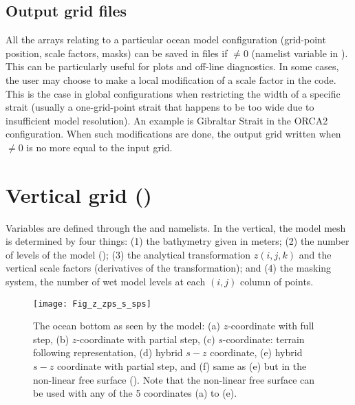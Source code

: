 \documentclass[../main/NEMO_manual]{subfiles}
\begin{document}
\subsection{Output grid files}
\label{subsec:DOM_hgr_files}

All the arrays relating to a particular ocean model configuration (grid-point position, scale factors, masks)
can be saved in files if  $\not= 0$ (namelist variable in ).
This can be particularly useful for plots and off-line diagnostics.
In some cases, the user may choose to make a local modification of a scale factor in the code.
This is the case in global configurations when restricting the width of a specific strait
(usually a one-grid-point strait that happens to be too wide due to insufficient model resolution).
An example is Gibraltar Strait in the ORCA2 configuration.
When such modifications are done,
the output grid written when  $\not= 0$ is no more equal to the input grid.

\section{Vertical grid (\protect{})}
\label{sec:DOM_zgr}
%


Variables are defined through the  and  namelists.
In the vertical, the model mesh is determined by four things: 
(1) the bathymetry given in meters; 
(2) the number of levels of the model (); 
(3) the analytical transformation $z(i,j,k)$ and the vertical scale factors (derivatives of the transformation); and
(4) the masking system, \ie the number of wet model levels at each 
$(i,j)$ column of points.

\begin{figure}[!tb]
  \begin{center}
    \texttt{[image: Fig\_z\_zps\_s\_sps]}
    \caption{
      \protect\label{fig:z_zps_s_sps}
      The ocean bottom as seen by the model:
      (a) $z$-coordinate with full step,
      (b) $z$-coordinate with partial step,
      (c) $s$-coordinate: terrain following representation,
      (d) hybrid $s-z$ coordinate,
      (e) hybrid $s-z$ coordinate with partial step, and
      (f) same as (e) but in the non-linear free surface (\protect{}).
      Note that the non-linear free surface can be used with any of the 5 coordinates (a) to (e).
    }
  \end{center}
\end{figure}
\end{document}
